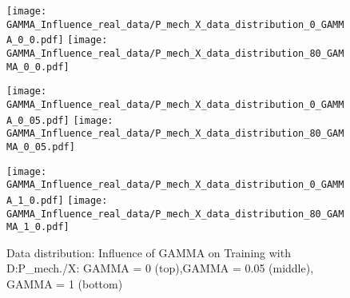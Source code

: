 \begin{figure}[htp]
  \centering
  \texttt{[image: GAMMA\_Influence\_real\_data/P\_mech\_X\_data\_distribution\_0\_GAMMA\_0\_0.pdf]}
  \hspace{.4cm}
  \texttt{[image: GAMMA\_Influence\_real\_data/P\_mech\_X\_data\_distribution\_80\_GAMMA\_0\_0.pdf]}

  \vspace{.1cm}

  \texttt{[image: GAMMA\_Influence\_real\_data/P\_mech\_X\_data\_distribution\_0\_GAMMA\_0\_05.pdf]}
  \hspace{.4cm}
  \texttt{[image: GAMMA\_Influence\_real\_data/P\_mech\_X\_data\_distribution\_80\_GAMMA\_0\_05.pdf]}

  \vspace{.1cm}

  \texttt{[image: GAMMA\_Influence\_real\_data/P\_mech\_X\_data\_distribution\_0\_GAMMA\_1\_0.pdf]}
  \hspace{.4cm}
  \texttt{[image: GAMMA\_Influence\_real\_data/P\_mech\_X\_data\_distribution\_80\_GAMMA\_1\_0.pdf]}

  \vspace{.1cm}

  \caption{Data  distribution:  Influence  of  GAMMA  on  Training with D:P\_mech./X:  GAMMA  =  0  (top),GAMMA = 0.05 (middle), GAMMA = 1 (bottom)}
  \label{fig:distribution_GAMMA_influence_real_data}
\end{figure}





